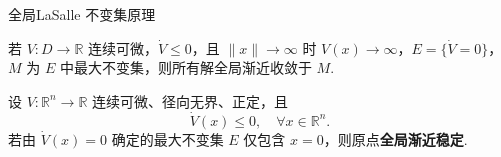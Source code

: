 \documentclass{beamer}
\begin{document}
		\begin{frame}{全局LaSalle 不变集原理}
		\begin{theorem}
			若 \(V:D\to\mathbb{R}\) 连续可微，\(\dot V\le0\)，且 \(\|x\|\to\infty\) 时 \(V(x)\to\infty\)，\(E=\{\dot V=0\}\)，\(M\) 为 \(E\) 中最大不变集，则所有解全局渐近收敛于 \(M\).
		\end{theorem}
		\begin{corollary}
			设 \(V:\mathbb{R}^n\to\mathbb{R}\) 连续可微、径向无界、正定，且
			\[
			\dot V(x)\le 0,\quad \forall x\in\mathbb{R}^n.
			\]
			若由 \(\dot V(x)=0\) 确定的最大不变集 \(E\) 仅包含 \(x=0\)，则原点\textbf{全局渐近稳定}.
		\end{corollary}
	\end{frame}
\end{document}
